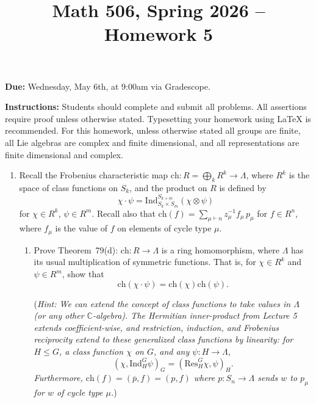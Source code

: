 \documentclass[12pt]{article}
\title{Math 506, Spring 2026 -- Homework 5}
\date{}
\newcommand{\C}{\mathbb{C}}
\newcommand{\ba}{\overline}
\newcommand{\Res}{\text{Res}}
\newcommand{\Ind}{\text{Ind}}
\newcommand{\ch}{\mathrm{ch}}
\begin{document}
 \maketitle
\vspace{-80pt}

\textbf{Due:} Wednesday, May 6th, at 9:00am via Gradescope.

\textbf{Instructions:} Students should complete and submit all problems. All assertions require proof unless otherwise stated. Typesetting your homework using LaTeX is recommended. For this homework, unless otherwise stated all groups are finite, all Lie algebras are complex and finite dimensional, and all representations are finite dimensional and complex.

\begin{enumerate}


\item[1.] Recall the Frobenius characteristic map $\ch: R = \bigoplus_k R^k \to \Lambda$,
where $R^k$ is the space of class functions on $S_k$, and the product on $R$ is defined by
\[
\chi \cdot \psi = \Ind^{S_{k+m}}_{S_k \times S_m}(\chi \otimes \psi)
\]
for $\chi \in R^k$, $\psi \in R^m$. Recall also that $\ch(f) = \sum_{\mu \vdash n} z_\mu^{-1} f_\mu\, p_\mu$
for $f \in R^n$, where $f_\mu$ is the value of $f$ on elements of cycle type $\mu$.

\begin{enumerate}
\item Prove Theorem~79(d): $\ch: R \to \Lambda$ is a ring homomorphism, where
$\Lambda$ has its usual multiplication of symmetric functions. That is, for
$\chi \in R^k$ and $\psi \in R^m$, show that
\[
\ch(\chi \cdot \psi) = \ch(\chi)\ch(\psi).
\]

(\emph{Hint: We can extend the concept of class functions to take values in $\Lambda$ (or any other $\C$-algebra). The Hermitian inner-product from Lecture 5 extends coefficient-wise, and restriction, induction, and Frobenius reciprocity extend to these generalized class functions by linearity: for $H\leq G$, a class
function $\chi$ on $G$, and any $\psi: H \to \Lambda$,
\[
( \chi, \Ind^G_H \psi )_G = ( \Res^G_H \chi, \psi)_H.
\]
Furthermore, $\ch(f) = (\ba{p},f) = (p,f)$ where $p: S_n \to \Lambda$ sends $w$ to $p_\mu$ for $w$ of cycle type $\mu$.})


\end{enumerate}
\end{enumerate}
\end{document}
